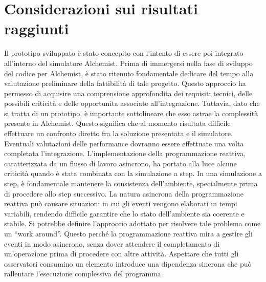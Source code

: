 \documentclass[12pt,a4paper,openright,twoside]{book}
\begin{document}
\section{Considerazioni sui risultati raggiunti}
Il prototipo sviluppato è stato concepito con l'intento di essere poi integrato all'interno del simulatore Alchemist. Prima di immergersi nella fase di sviluppo del codice per Alchemist, è stato ritenuto fondamentale dedicare del tempo alla valutazione preliminare della fattibilità di tale progetto. Questo approccio ha permesso di acquisire una comprensione approfondita dei requisiti tecnici, delle possibili criticità e delle opportunita associate all'integrazione. 
Tuttavia, dato che si tratta di un prototipo, è importante sottolineare che esso astrae la complessità presente in Alchemist. Questo significa che al momento risultata difficile effettuare un confronto diretto fra la soluzione presentata e il simulatore. Eventuali valutazioni delle performance dovranno essere effettuate una volta completata l'integrazione. 
L'implementazione della programmazione reattiva, caratterizzata da un flusso di lavoro asincrono, ha portato alla luce alcune criticità quando è stata combinata con la simulazione a step. In una simulazione a step, è fondamentale mantenere la consistenza dell'ambiente, specialmente prima di procedere allo step successivo. La natura asincrona della programmazione reattiva può causare situazioni in cui gli eventi vengono elaborati in tempi variabili, rendendo difficile garantire che lo stato dell'ambiente sia coerente e stabile. Si potrebbe definire l'approccio adottato per risolvere tale problema come un ``work around''. Questo perché la programmazione reattiva mira a gestire gli eventi in modo asincrono, senza dover attendere il completamento di un'operazione prima di procedere con altre attività. Aspettare che tutti gli osservatori consumino un elemento introduce una dipendenza sincrona che può rallentare l'esecuzione complessiva del programma.
\end{document}
